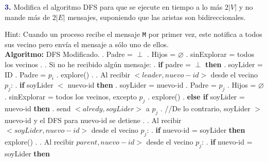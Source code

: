 \newpage
\textbf{\textcolor{MidnightBlue}{3.}}
Modifica el algoritmo DFS para que se ejecute en tiempo a lo más $2|V|$ y no
mande más de $2|E|$ mensajes, suponiendo que las aristas son bidireccionales.

Hint: Cuando un proceso recibe el mensaje {\tt M} por primer vez, este notifica
a todos sus vecino pero envía el mensaje a sólo uno de ellos.\\

\large
  \hfill\break
  \hspace*{.2cm} {\bf Algoritmo:} DFS Modificado.
  \hfill{}. Padre = $\perp$
  \hfill{}. Hijos = $\varnothing$
  \hfill{}. sinExplorar = todos los vecinos
  \hfill{}.
  \hfill{}. Si no he recibido algún mensaje:
  \hfill{}. \hspace{0.5cm} {\bf if} padre = $\perp$ {\bf then}
  \hfill{}. \hspace{1cm} soyLider = ID
  \hfill{}. \hspace{1cm} Padre = $p_i$
  \hfill{}. \hspace{1cm} explore()
  \hfill{}.
  \hfill{}. Al recibir $<leader,nuevo-id>$ desde el vecino $p_j$:
  \hfill{}. \hspace{0.5cm} {\bf if} soyLider $<$ nuevo-id {\bf then}
  \hfill{}. \hspace{1cm} soyLider = nuevo-id
  \hfill{}. \hspace{1cm} Padre = $p_j$
  \hfill{}. \hspace{1cm} Hijos = $\varnothing$
  \hfill{}. \hspace{1cm} sinExplorar = todos los vecinos, excepto $p_j$
  \hfill{}. \hspace{1cm} explore()
  \hfill{}. \hspace{0.5cm} {\bf else if} soyLider = nuevo-id {\bf then}
  \hfill{}. \hspace{1cm} send $<alredy,soyLider>$ a $p_j$
  \hfill{}. //De lo contrario, soyLider $>$ nuevo-id y el DFS para nuevo-id se detiene
  \hfill{}.
  \hfill{}. Al recibir $<soyLider,nuevo-id>$ desde el vecino $p_j$:
  \hfill{}. \hspace{0.5cm} {\bf if} nuevo-id = soyLider {\bf then} explore()
  \hfill{}.
  \hfill{}. Al recibir $parent,nuevo-id>$ desde el vecino $p_j$:
  \hfill{}. \hspace{0.5cm} {\bf if} nuevo-id = soyLider {\bf then}
